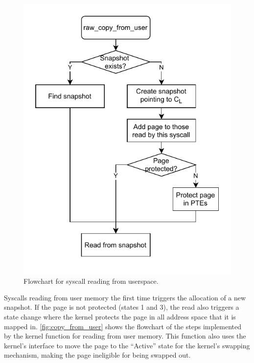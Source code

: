 \documentclass[letterpaper,twocolumn,10pt, anonymous]{article}
\begin{document}
\begin{figure}[]
  \centering
  \includegraphics[width=0.8\linewidth]{img/copy_from_user.pdf}
  \caption{Flowchart for syscall reading from userspace.}
  \label{fig:copy_from_user}
\end{figure}

Syscalls reading from user memory the first time triggers the 
allocation of a new snapshot. 
If the page is not protected (states 1 and 3), the read also 
triggers a state change where the kernel protects the page
in all address space that it is mapped in. 
\autoref{fig:copy_from_user} shows the flowchart of the steps
implemented by the kernel function  for 
reading from user memory.
This function also uses the kernel's  
interface to move the page to the ``Active'' state for the 
kernel's swapping mechanism, making the page ineligible for being 
swapped out. 
\end{document}
